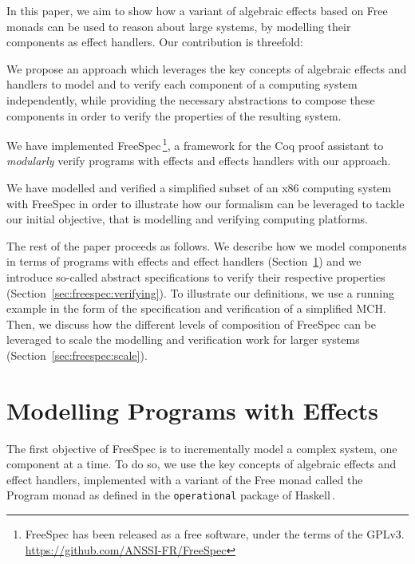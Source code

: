 In this paper, we aim to show how a variant of algebraic effects based on Free
monads can be used to reason about large systems, by modelling their components
as effect handlers.
%
Our contribution is threefold:
\begin{compactitem}
\item We propose an approach which leverages the key concepts of
algebraic effects and handlers to model and to verify each component of a computing
system independently, while providing the necessary abstractions to compose
these components in order to verify the properties of the resulting system.
\item We have implemented FreeSpec\,\footnote{FreeSpec has been released as a
free software, under the terms of the GPLv3.
\url{https://github.com/ANSSI-FR/FreeSpec}}, a framework for the Coq proof
assistant to \emph{modularly} verify programs with effects and
effects handlers with our approach.
\item We have modelled and verified a simplified subset of an x86 computing
system with FreeSpec in order to illustrate how our formalism can be leveraged
to tackle our initial objective, that is modelling and verifying computing
platforms.
\end{compactitem}

The rest of the paper proceeds as follows.
%
We describe how we model components in terms of programs with effects and effect
handlers (Section~\ref{sec:freespec:specifying}) and we introduce so-called abstract
specifications to verify their respective properties
(Section~\ref{sec:freespec:verifying}).
%
To illustrate our definitions, we use a running example in the form of the
specification and verification of a simplified MCH.
%
Then, we discuss how the different levels of composition of FreeSpec can be
leveraged to scale the modelling and verification work for larger systems
(Section~\ref{sec:freespec:scale}).

\section{Modelling Programs with Effects}
\label{sec:freespec:specifying}

The first objective of FreeSpec is to incrementally model a complex system,
one component at a time.
%
To do so, we use the key concepts of algebraic effects and effect handlers,
implemented with a variant of the Free monad called the Program monad as defined
in the \texttt{operational} package of Haskell\,\cite{operational}.

